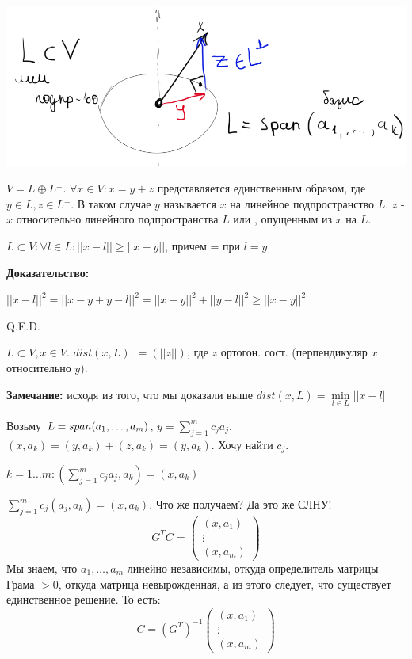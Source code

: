 \begin{center}
   \includegraphics[width = 10 cm]{assets/9_4-orthogonal-projection.png}
\end{center}

$V = L \oplus L^\perp$. $\forall x \in V: x = y + z$ представляется единственным образом, где $y\in L, z\in L^\perp$. В таком случае $y$ называется  $x$ на линейное подпространство $L$. $z$ -  $x$ относительно линейного подпространства $L$ или , опущенным из $x$ на $L$.


$L \subset V: \forall  l \in L: ||x-l|| \geq ||x-y||$, причем = при $l=y$

\textbf{Доказательство:}

$||x-l||^2 = ||x-y +y - l||^2 = ||x-y||^2 + ||y-l||^2 \geq ||x-y||^2$

\hfill Q.E.D.

 $L \subset V, x\in V$. $dist(x,L) : = (||z||)$, где $z$ ортогон. сост. (перпендикуляр $x$ относительно $y$).

\textbf{Замечание:} исходя из того, что мы доказали выше $dist(x,L) =\min\limits_{l\in L} ||x-l||$


Возьму $L = span(a_1,\ldots, a_m)$, $y= \sum\limits_{j=1}^{m}c_ja_j$. $(x,a_k) = (y,a_k) + (z,a_k)= (y,a_k)$. Хочу найти $c_j$.

$k = 1\ldots m: \left(\sum\limits_{j=1}^m c_j a_j, a_k\right) = (x,a_k)$

$\sum\limits_{j=1}^m c_j (a_j, a_k) =(x,a_k)$. Что же получаем? Да это же СЛНУ!
$$G^TC = \begin{pmatrix}
    (x,a_1)\\
    \vdots \\
    (x,a_m)
\end{pmatrix}$$
Мы знаем, что $a_1,\ldots , a_m$ линейно независимы, откуда определитель матрицы Грама $>0$, откуда матрица невырожденная, а из этого следует, что существует единственное решение. То есть:
$$C = (G^T)^{-1}\begin{pmatrix}
    (x,a_1)\\
    \vdots \\
    (x,a_m)
\end{pmatrix}$$

